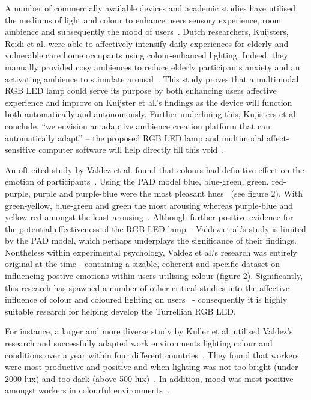 \documentclass{sigchi}
\begin{document}
A number of commercially available devices and academic studies have utilised the mediums of light and colour to enhance users sensory experience, room ambience and subsequently the mood of users~\cite{flores2017effect, kuijsters2011improving, kuijsters2015lighting}. Dutch researchers, Kuijsters, Reidi et al. were able to affectively intensify daily experiences for elderly and vulnerable care home occupants using colour-enhanced lighting. Indeed, they manually provided cosy ambiences to reduce elderly participants anxiety and an activating ambience to stimulate arousal~\cite{kuijsters2015lighting}. This study proves that a multimodal RGB LED lamp could serve its purpose by both enhancing users affective experience and improve on Kuijster et al.’s findings as the device will function both automatically and autonomously. Further underlining this, Kujisters et al. conclude, “we envision an adaptive ambience creation platform that can automatically adapt” – the proposed RGB LED lamp and multimodal affect-sensitive computer software will help directly fill this void~\cite{kuijsters2015lighting}.

An oft-cited study by Valdez et al. found that colours had definitive effect on the emotion of participants~\cite{valdez1994effects}. Using the PAD model blue, blue-green, green, red-purple, purple and purple-blue were the most pleasant hues~\cite{valdez1994effects} (see figure 2). With green-yellow, blue-green and green the most arousing whereas purple-blue and yellow-red amongst the least arousing~\cite{valdez1994effects}. Although further positive evidence for the potential effectiveness of the RGB LED lamp – Valdez et al.’s study is limited by the PAD model, which perhaps underplays the significance of their findings. Nontheless within experimental psychology, Valdez et al.'s research was entirely original at the time -  containing a sizable, coherent and specific dataset on influencing postive emotions within users utilising colour (figure 2). Significantly, this research has spawned a number of other critical studies into the affective influence of colour and coloured lighting on users~\cite{han2017effects, jo2014smart, kim2014study, lee2019effects, wardono2012effects, yang2015lighting} - consequently it is highly suitable research for helping develop the Turrellian RGB LED.

For instance, a larger and more diverse study by Kuller et al. utilised Valdez’s research and successfully adapted work environments lighting colour and conditions over a year within four different countries~\cite{kuller2006impact, kuller2009color}. They found that workers were most productive and positive and when lighting was not too bright (under 2000 lux) and too dark (above 500 lux)~\cite{kuller2006impact, kuller2009color}. In addition, mood was most positive amongst workers in colourful environments~\cite{kuller1986physiological}.
\end{document}
